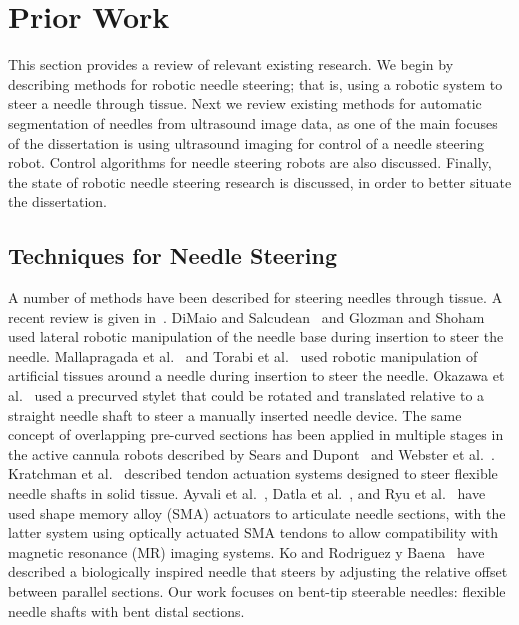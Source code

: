 \section{Prior Work}
This section provides a review of relevant existing research. We begin by describing methods for robotic needle steering; that is, using a robotic system to steer a needle through tissue. Next we review existing methods for automatic segmentation of needles from ultrasound image data, as one of the main focuses of the dissertation is using ultrasound imaging for control of a needle steering robot. Control algorithms for needle steering robots are also discussed. Finally, the state of robotic needle steering research is discussed, in order to better situate the dissertation.

\subsection{Techniques for Needle Steering}
A number of methods have been described for steering needles through tissue. A recent review is given in~\cite{vandeBerg2014}. DiMaio and Salcudean~\cite{DiMaio2005} and Glozman and Shoham~\cite{Glozman2007} used lateral robotic manipulation of the needle base during insertion to steer the needle. Mallapragada et al.~\cite{Mallapragada2009} and Torabi et al.~\cite{Torabi2009} used robotic manipulation of artificial tissues around a needle during insertion to steer the needle. Okazawa et al.~\cite{Okazawa2005} used a precurved stylet that could be rotated and translated relative to a straight needle shaft to steer a manually inserted needle device. The same concept of overlapping pre-curved sections has been applied in multiple stages in the active cannula robots described by Sears and Dupont~\cite{Sears2006} and Webster et al.~\cite{Webster2009}. Kratchman et al.~\cite{Kratchman2011} described tendon actuation systems designed to steer flexible needle shafts in solid tissue. Ayvali et al.~\cite{Ayvali2012}, Datla et al.~\cite{Datla2014}, and Ryu et al.~\cite{Ryu2014} have used shape memory alloy (SMA) actuators to articulate needle sections, with the latter system using optically actuated SMA tendons to allow compatibility with magnetic resonance (MR) imaging systems. Ko and Rodriguez y Baena~\cite{Ko2013} have described a biologically inspired needle that steers by adjusting the relative offset between parallel sections. Our work focuses on bent-tip steerable needles: flexible needle shafts with bent distal sections. 

